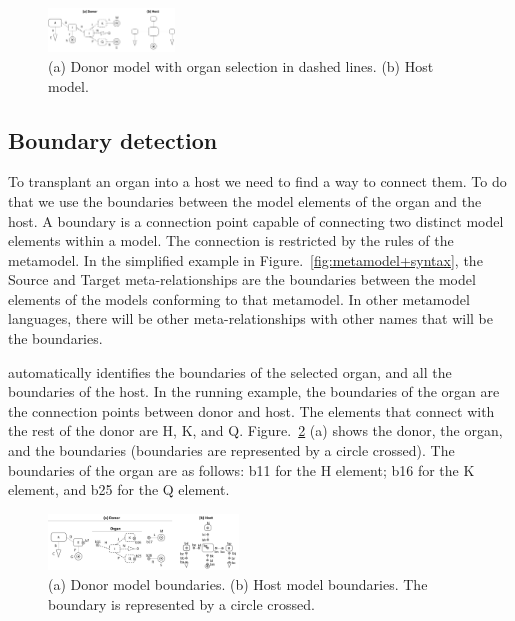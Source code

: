 \begin{figure}[tb]
    \centering
    \includegraphics[width=0.30\textwidth]{Figures/donor+host.png}
    \caption{(a) Donor model with organ selection in dashed lines. (b) Host model.}
    \label{fig:donor_host}
\end{figure}


\subsection{Boundary detection}

To transplant an organ into a host we need to find a way to connect them. To do that we use the boundaries between the model elements of the organ and the host. A boundary is a connection point capable of connecting two distinct model elements within a model. The connection is restricted by the rules of the metamodel. In the simplified example in Figure.~\ref{fig:metamodel+syntax}, the Source and Target meta-relationships are the boundaries between the model elements of the models conforming to that metamodel. In other metamodel languages, there will be other meta-relationships with other names that will be the boundaries.

\ApproachName{} automatically identifies the boundaries of the selected organ, and all the boundaries of the host. In the running example, the boundaries of the organ are the connection points between donor and host. The elements that connect with the rest of the donor are H, K, and Q. Figure.~\ref{fig:org_bound} (a) shows the donor, the organ, and the boundaries (boundaries are represented by a circle crossed). The boundaries of the organ are as follows: b11 for the H element; b16 for the K element, and b25 for the Q element.

\begin{figure}[tb]
    \centering
    \includegraphics[width=0.45\textwidth]{Figures/donor+host+boundaries.png}
    \caption{(a) Donor model boundaries. (b) Host model boundaries. The boundary is represented by a circle crossed.}
    \label{fig:org_bound}
\end{figure}


